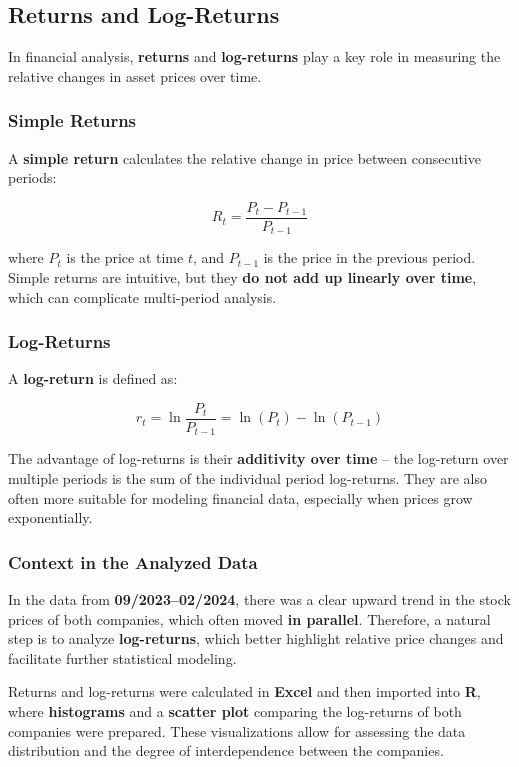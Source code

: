\documentclass[
]{article}
\begin{document}
\subsection{Returns and Log-Returns}\label{returns-and-log-returns}

In financial analysis, \textbf{returns} and \textbf{log-returns} play a
key role in measuring the relative changes in asset prices over time.

\subsubsection{Simple Returns}\label{simple-returns}

A \textbf{simple return} calculates the relative change in price between
consecutive periods:

\[
R_t = \frac{P_t - P_{t-1}}{P_{t-1}}
\]

where \(P_t\) is the price at time \(t\), and \(P_{t-1}\) is the price
in the previous period. Simple returns are intuitive, but they
\textbf{do not add up linearly over time}, which can complicate
multi-period analysis.

\subsubsection{Log-Returns}\label{log-returns}

A \textbf{log-return} is defined as:

\[
r_t = \ln\frac{P_t}{P_{t-1}} = \ln(P_t) - \ln(P_{t-1})
\]

The advantage of log-returns is their \textbf{additivity over time} --
the log-return over multiple periods is the sum of the individual period
log-returns. They are also often more suitable for modeling financial
data, especially when prices grow exponentially.

\subsubsection{Context in the Analyzed
Data}\label{context-in-the-analyzed-data}

In the data from \textbf{09/2023--02/2024}, there was a clear upward
trend in the stock prices of both companies, which often moved
\textbf{in parallel}. Therefore, a natural step is to analyze
\textbf{log-returns}, which better highlight relative price changes and
facilitate further statistical modeling.

Returns and log-returns were calculated in \textbf{Excel} and then
imported into \textbf{R}, where \textbf{histograms} and a
\textbf{scatter plot} comparing the log-returns of both companies were
prepared. These visualizations allow for assessing the data distribution
and the degree of interdependence between the companies.
\end{document}
